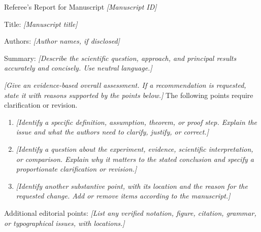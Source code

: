 \documentclass{amsart}
\newcommand{\Placeholder}[1]{\textit{[#1]}}
\begin{document}
\setlength{\baselineskip}{15pt}

\noindent Referee's Report for Manuscript \Placeholder{Manuscript ID}
\bigskip

\noindent Title: \Placeholder{Manuscript title}
\medskip

\noindent Authors: \Placeholder{Author names, if disclosed}
\bigskip

\noindent Summary:
\Placeholder{Describe the scientific question, approach, and principal results
accurately and concisely. Use neutral language.}

\Placeholder{Give an evidence-based overall assessment. If a recommendation is
requested, state it with reasons supported by the points below.}
The following points require clarification or revision.

\begin{enumerate}

\item \Placeholder{Identify a specific definition, assumption, theorem, or proof
step. Explain the issue and what the authors need to clarify, justify, or correct.}

\item \Placeholder{Identify a question about the experiment, evidence, scientific
interpretation, or comparison. Explain why it matters to the stated conclusion
and specify a proportionate clarification or revision.}

\item \Placeholder{Identify another substantive point, with its location and the
reason for the requested change. Add or remove items according to the manuscript.}

\end{enumerate}

\noindent Additional editorial points:
\Placeholder{List any verified notation, figure, citation, grammar, or typographical
issues, with locations.}
\end{document}
